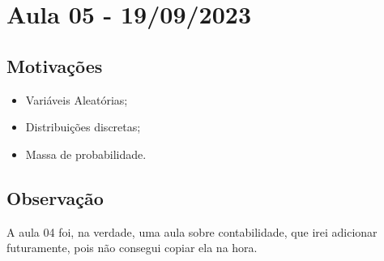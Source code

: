 \documentclass{article}
\begin{document}
\newpage

\section{Aula 05 - 19/09/2023}
\subsection{Motivações}
\begin{itemize}
  \item Variáveis Aleatórias;
  \item Distribuições discretas;
  \item Massa de probabilidade.
\end{itemize}
\subsection{Observação}
  A aula 04 foi, na verdade, uma aula sobre contabilidade, que irei adicionar futuramente, pois não consegui copiar ela na hora.
\end{document}
